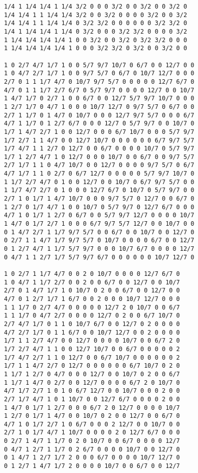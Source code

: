\documentclass[10p,a4paper,BCOR = 12mm, DIV=15]{scrbook}
\begin{document}
\begin{verbatim}
1/4 1 1/4 1/4 1 1/4 3/2 0 0 0 3/2 0 0 3/2 0 0 3/2 0
1/4 1/4 1 1 1/4 1/4 3/2 0 0 3/2 0 0 0 0 3/2 0 0 3/2
1/4 1/4 1 1 1/4 1/4 0 3/2 3/2 0 0 0 0 0 0 3/2 3/2 0
1/4 1 1/4 1/4 1 1/4 0 3/2 0 0 0 3/2 3/2 0 0 0 0 3/2
1 1/4 1/4 1/4 1/4 1 0 0 3/2 0 0 3/2 0 3/2 3/2 0 0 0
1 1/4 1/4 1/4 1/4 1 0 0 0 3/2 3/2 0 3/2 0 0 3/2 0 0

1 0 2/7 4/7 1/7 1 0 0 5/7 9/7 10/7 0 6/7 0 0 12/7 0 0
1 0 4/7 2/7 1/7 1 0 0 9/7 5/7 0 6/7 0 10/7 12/7 0 0 0
2/7 0 1 1 1/7 4/7 0 10/7 9/7 5/7 0 0 0 0 0 12/7 6/7 0
4/7 0 1 1 1/7 2/7 6/7 0 5/7 9/7 0 0 0 0 12/7 0 0 10/7
1 4/7 1/7 0 2/7 1 0 0 6/7 0 0 12/7 5/7 9/7 10/7 0 0 0
1 2/7 1/7 0 4/7 1 0 0 0 10/7 12/7 0 9/7 5/7 0 6/7 0 0
2/7 1 1/7 0 1 4/7 0 10/7 0 0 0 12/7 9/7 5/7 0 0 0 6/7
4/7 1 1/7 0 1 2/7 6/7 0 0 0 12/7 0 5/7 9/7 0 0 10/7 0
1/7 1 4/7 2/7 1 0 0 12/7 0 0 0 6/7 10/7 0 0 0 5/7 9/7
1/7 2/7 1 1 4/7 0 0 12/7 10/7 0 0 0 0 0 0 6/7 9/7 5/7
1/7 4/7 1 1 2/7 0 12/7 0 0 6/7 0 0 0 0 10/7 0 5/7 9/7
1/7 1 2/7 4/7 1 0 12/7 0 0 0 10/7 0 0 6/7 0 0 9/7 5/7
2/7 1/7 1 1 0 4/7 10/7 0 0 12/7 0 0 0 0 9/7 5/7 0 6/7
4/7 1/7 1 1 0 2/7 0 6/7 12/7 0 0 0 0 0 5/7 9/7 10/7 0
1 1/7 2/7 4/7 0 1 0 0 12/7 0 0 10/7 0 6/7 9/7 5/7 0 0
1 1/7 4/7 2/7 0 1 0 0 0 12/7 6/7 0 10/7 0 5/7 9/7 0 0
2/7 1 0 1/7 1 4/7 10/7 0 0 0 9/7 5/7 0 12/7 0 0 6/7 0
1 2/7 0 1/7 4/7 1 0 0 10/7 0 5/7 9/7 0 12/7 6/7 0 0 0
4/7 1 0 1/7 1 2/7 0 6/7 0 0 5/7 9/7 12/7 0 0 0 0 10/7
1 4/7 0 1/7 2/7 1 0 0 0 6/7 9/7 5/7 12/7 0 0 10/7 0 0
0 1 4/7 2/7 1 1/7 9/7 5/7 0 0 6/7 0 0 10/7 0 0 12/7 0
0 2/7 1 1 4/7 1/7 9/7 5/7 0 10/7 0 0 0 0 6/7 0 0 12/7
0 1 2/7 4/7 1 1/7 5/7 9/7 0 0 0 10/7 6/7 0 0 0 0 12/7
0 4/7 1 1 2/7 1/7 5/7 9/7 6/7 0 0 0 0 0 0 10/7 12/7 0

1 0 2/7 1 1/7 4/7 0 0 2 0 10/7 0 0 0 0 12/7 6/7 0
1 0 4/7 1 1/7 2/7 0 0 2 0 0 6/7 0 0 12/7 0 0 10/7
2/7 0 1 4/7 1/7 1 0 10/7 0 2 0 0 6/7 0 0 12/7 0 0
4/7 0 1 2/7 1/7 1 6/7 0 0 2 0 0 0 10/7 12/7 0 0 0
1 1 1/7 0 2/7 4/7 0 0 0 0 0 12/7 2 0 10/7 0 0 6/7
1 1 1/7 0 4/7 2/7 0 0 0 0 12/7 0 2 0 0 6/7 10/7 0
2/7 4/7 1/7 0 1 1 0 10/7 6/7 0 0 12/7 0 2 0 0 0 0
4/7 2/7 1/7 0 1 1 6/7 0 0 10/7 12/7 0 0 2 0 0 0 0
1/7 1 1 2/7 4/7 0 0 12/7 0 0 0 0 10/7 0 0 6/7 2 0
1/7 2/7 4/7 1 1 0 0 12/7 10/7 0 0 6/7 0 0 0 0 0 2
1/7 4/7 2/7 1 1 0 12/7 0 0 6/7 10/7 0 0 0 0 0 0 2
1/7 1 1 4/7 2/7 0 12/7 0 0 0 0 0 0 6/7 10/7 0 2 0
1 1/7 1 2/7 0 4/7 0 0 0 12/7 0 0 10/7 0 2 0 0 6/7
1 1/7 1 4/7 0 2/7 0 0 12/7 0 0 0 0 6/7 2 0 10/7 0
4/7 1/7 2/7 1 0 1 0 6/7 12/7 0 0 10/7 0 0 0 2 0 0
2/7 1/7 4/7 1 0 1 10/7 0 0 12/7 6/7 0 0 0 0 2 0 0
1 4/7 0 1/7 1 2/7 0 0 0 6/7 2 0 12/7 0 0 0 0 10/7
1 2/7 0 1/7 1 4/7 0 0 10/7 0 2 0 0 12/7 0 0 6/7 0
4/7 1 0 1/7 2/7 1 0 6/7 0 0 0 2 12/7 0 0 10/7 0 0
2/7 1 0 1/7 4/7 1 10/7 0 0 0 0 2 0 12/7 6/7 0 0 0
0 2/7 1 4/7 1 1/7 0 2 0 10/7 0 0 6/7 0 0 0 0 12/7
0 4/7 1 2/7 1 1/7 0 2 6/7 0 0 0 0 10/7 0 0 12/7 0
0 1 4/7 1 2/7 1/7 2 0 0 0 6/7 0 0 0 0 10/7 12/7 0
0 1 2/7 1 4/7 1/7 2 0 0 0 0 10/7 0 0 6/7 0 0 12/7
\end{verbatim}
\end{document}
